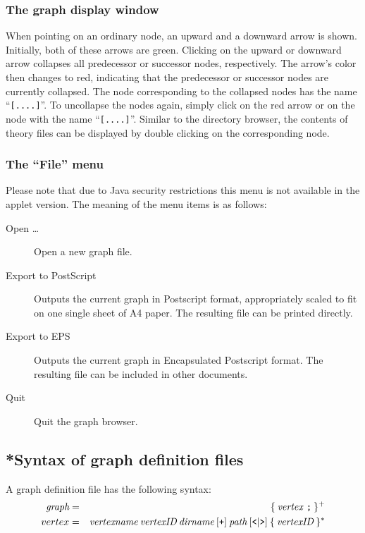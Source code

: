 \subsubsection*{The graph display window}

When pointing on an ordinary node, an upward and a downward arrow is
shown.  Initially, both of these arrows are green. Clicking on the
upward or downward arrow collapses all predecessor or successor nodes,
respectively. The arrow's color then changes to red, indicating that
the predecessor or successor nodes are currently collapsed. The node
corresponding to the collapsed nodes has the name ``{\tt [....]}''. To
uncollapse the nodes again, simply click on the red arrow or on the
node with the name ``{\tt [....]}''. Similar to the directory browser,
the contents of theory files can be displayed by double clicking on
the corresponding node.


\subsubsection*{The ``File'' menu}

Please note that due to Java security restrictions this menu is not
available in the applet version. The meaning of the menu items is as
follows:
\begin{description}
  
\item[Open \dots] Open a new graph file.
  
\item[Export to PostScript] Outputs the current graph in Postscript format,
  appropriately scaled to fit on one single sheet of A4 paper.  The resulting
  file can be printed directly.
  
\item[Export to EPS] Outputs the current graph in Encapsulated Postscript
  format. The resulting file can be included in other documents.

\item[Quit] Quit the graph browser.

\end{description}


\subsection*{*Syntax of graph definition files}

A graph definition file has the following syntax:
\begin{eqnarray*}
  \mbox{\it graph} & = & \{ \: \mbox{\it vertex \tt ;} \: \} ^ + \\
  vertex & = & \mbox{\it vertexname} \: \mbox{\it vertexID} \: \mbox{\it dirname} \: [ \mbox{\tt +} ]
  \: \mbox{\it path} \: [ \mbox{\tt <} | \mbox{\tt >} ] \: \{ \: \mbox{\it vertexID} \: \} ^ *
\end{eqnarray*}

